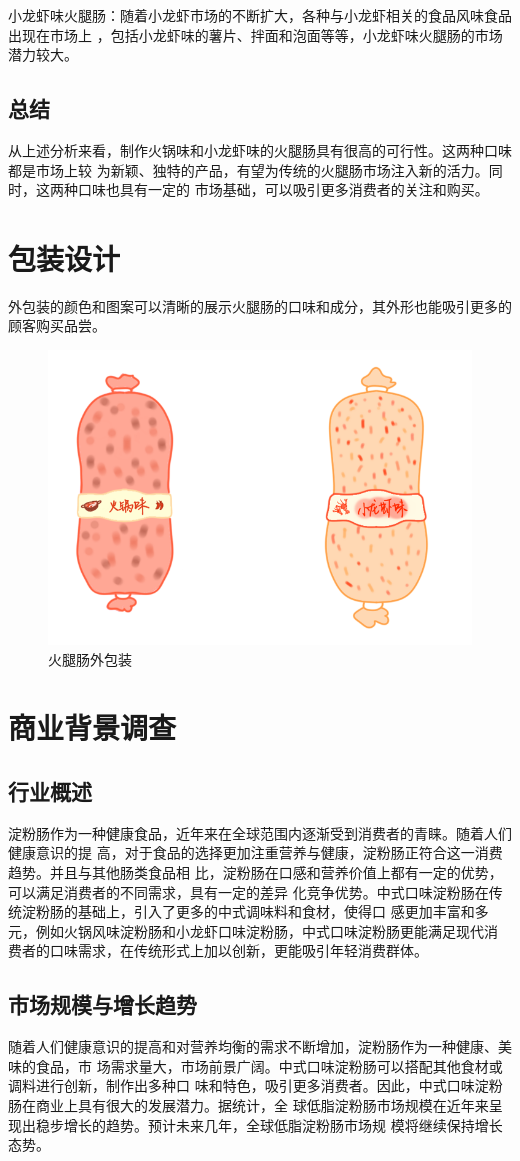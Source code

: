 \documentclass[UTF8]{ctexart}
\begin{document}
	小龙虾味火腿肠：随着小龙虾市场的不断扩大，各种与小龙虾相关的食品风味食品出现在市场上
	，包括小龙虾味的薯片、拌面和泡面等等，小龙虾味火腿肠的市场潜力较大。

	\subsection{总结}
	从上述分析来看，制作火锅味和小龙虾味的火腿肠具有很高的可行性。这两种口味都是市场上较
	为新颖、独特的产品，有望为传统的火腿肠市场注入新的活力。同时，这两种口味也具有一定的
	市场基础，可以吸引更多消费者的关注和购买。

	\section{包装设计}

	外包装的颜色和图案可以清晰的展示火腿肠的口味和成分，其外形也能吸引更多的顾客购买品尝。

	\begin{figure}[htb]
		\centering
		\includegraphics[width=0.5\linewidth]{img/package.png}
		\caption{火腿肠外包装}
	\end{figure}
	\section{商业背景调查}
	\subsection{行业概述}
	淀粉肠作为一种健康食品，近年来在全球范围内逐渐受到消费者的青睐。随着人们健康意识的提
	高，对于食品的选择更加注重营养与健康，淀粉肠正符合这一消费趋势。并且与其他肠类食品相
	比，淀粉肠在口感和营养价值上都有一定的优势，可以满足消费者的不同需求，具有一定的差异
	化竞争优势。中式口味淀粉肠在传统淀粉肠的基础上，引入了更多的中式调味料和食材，使得口
	感更加丰富和多元，例如火锅风味淀粉肠和小龙虾口味淀粉肠，中式口味淀粉肠更能满足现代消
	费者的口味需求，在传统形式上加以创新，更能吸引年轻消费群体。

	\subsection{市场规模与增长趋势}
	随着人们健康意识的提高和对营养均衡的需求不断增加，淀粉肠作为一种健康、美味的食品，市
	场需求量大，市场前景广阔。中式口味淀粉肠可以搭配其他食材或调料进行创新，制作出多种口
	味和特色，吸引更多消费者。因此，中式口味淀粉肠在商业上具有很大的发展潜力。据统计，全
	球低脂淀粉肠市场规模在近年来呈现出稳步增长的趋势。预计未来几年，全球低脂淀粉肠市场规
	模将继续保持增长态势。
\end{document}
